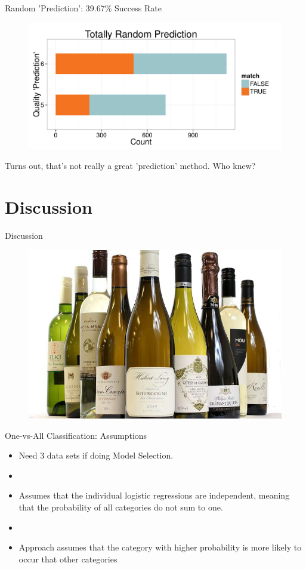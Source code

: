 \documentclass{beamer}
\begin{document}
\begin{frame}{Random 'Prediction': 39.67\% Success Rate}
	\begin{figure}
		\centering
		\includegraphics[width=\textwidth]{../images/RandomPrediction.pdf}
	\end{figure}
	Turns out, that's not really a great 'prediction' method. Who knew?
\end{frame}


\section{Discussion}
\begin{frame}{Discussion}
	\begin{figure}
		\centering
		\includegraphics[width=\textwidth]{../images/wines.jpg}
	\end{figure}
\end{frame}

\begin{frame}{One-vs-All Classification: Assumptions}
	\begin{itemize}
	\item Need 3 data sets if doing Model Selection. 
	\item[]
	\item Assumes that the individual logistic regressions are independent, meaning that the probability of all categories do not sum to one. 
	\item[]
	\item Approach assumes that the category with higher probability is more likely to occur that other categories
	\end{itemize}
\end{frame}
\end{document}
